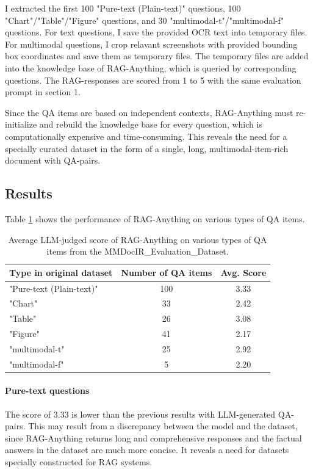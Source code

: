 \documentclass{article}
\begin{document}
  I extracted the first 100 "Pure-text (Plain-text)" questions, 100 "Chart"/"Table"/"Figure" questions, and 30 "multimodal-t"/"multimodal-f" questions.
  For text questions, I save the provided OCR text into temporary files.
  For multimodal questions, I crop relavant screenshots with provided bounding box coordinates and save them as temporary files.
  The temporary files are added into the knowledge base of RAG-Anything, which is queried by corresponding questions.
  The RAG-responses are scored from 1 to 5 with the same evaluation prompt in section 1.

  Since the QA items are based on independent contexts, RAG-Anything must re-initialize and rebuild the knowledge base for every question, which is computationally expensive and time-consuming.
  This reveals the need for a specially curated dataset in the form of a single, long, multimodal-item-rich document with QA-pairs.

  \subsection{Results}

  Table \ref{tab:results2} shows the performance of RAG-Anything on various types of QA items.

  \begin{table}[ht]
        \centering
        \label{tab:results2}
        \begin{tabular}{l|cc}
        \toprule
          Type in original dataset& Number of QA items & Avg. Score\\
          \midrule
            "Pure-text (Plain-text)" & 100 & 3.33\\
            "Chart" &     33  & 2.42\\
            "Table" &  26 & 3.08\\
            "Figure" &   41 & 2.17\\
            "multimodal-t" &  25 &  2.92 \\
            "multimodal-f" &   5 & 2.20 \\
        \bottomrule
        \end{tabular}
        \vspace{12pt}
        \caption{Average LLM-judged score of RAG-Anything on various types of QA items from the MMDocIR\_Evaluation\_Dataset.}
    \end{table}

  \paragraph{Pure-text questions}
  The score of 3.33 is lower than the previous results with LLM-generated QA-pairs.
  This may result from a discrepancy between the model and the dataset,
  since RAG-Anything returns long and comprehensive responses and the factual answers in the dataset are much more concise.
  It reveals a need for datasets specially constructed for RAG systems.
\end{document}
